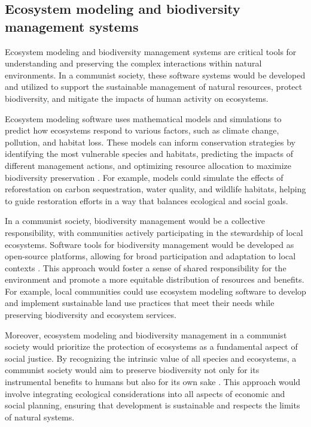\subsection{Ecosystem modeling and biodiversity management systems}

Ecosystem modeling and biodiversity management systems are critical tools for understanding and preserving the complex interactions within natural environments. In a communist society, these software systems would be developed and utilized to support the sustainable management of natural resources, protect biodiversity, and mitigate the impacts of human activity on ecosystems.

Ecosystem modeling software uses mathematical models and simulations to predict how ecosystems respond to various factors, such as climate change, pollution, and habitat loss. These models can inform conservation strategies by identifying the most vulnerable species and habitats, predicting the impacts of different management actions, and optimizing resource allocation to maximize biodiversity preservation \cite[pp.~60-67]{grimm2005pattern}. For example, models could simulate the effects of reforestation on carbon sequestration, water quality, and wildlife habitats, helping to guide restoration efforts in a way that balances ecological and social goals.

In a communist society, biodiversity management would be a collective responsibility, with communities actively participating in the stewardship of local ecosystems. Software tools for biodiversity management would be developed as open-source platforms, allowing for broad participation and adaptation to local contexts \cite[pp.~302-309]{turner2007biodiversity}. This approach would foster a sense of shared responsibility for the environment and promote a more equitable distribution of resources and benefits. For example, local communities could use ecosystem modeling software to develop and implement sustainable land use practices that meet their needs while preserving biodiversity and ecosystem services.

Moreover, ecosystem modeling and biodiversity management in a communist society would prioritize the protection of ecosystems as a fundamental aspect of social justice. By recognizing the intrinsic value of all species and ecosystems, a communist society would aim to preserve biodiversity not only for its instrumental benefits to humans but also for its own sake \cite[pp.~410-418]{mace2012biodiversity}. This approach would involve integrating ecological considerations into all aspects of economic and social planning, ensuring that development is sustainable and respects the limits of natural systems.

